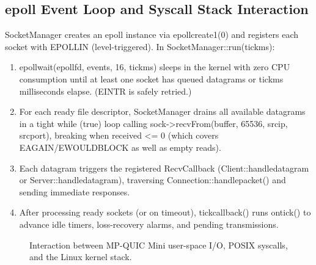 \documentclass[10pt,a4paper]{article}
\newcommand{\codeul}{\textunderscore\hspace{0pt}}
\DeclareRobustCommand{\code}[1]{{\ttfamily\let\_\codeul #1}}
\begin{document}
\subsection{\code{epoll} Event Loop and Syscall Stack Interaction}
\code{SocketManager} creates an epoll instance via \code{epoll\_create1(0)} and registers each socket with \code{EPOLLIN} (level-triggered). In \code{SocketManager::run(tick\_ms)}:
\begin{enumerate}
    \item \code{epoll\_wait(epoll\_fd, events, 16, tick\_ms)} sleeps in the kernel with zero CPU consumption until at least one socket has queued datagrams or \code{tick\_ms} milliseconds elapse. (\code{EINTR} is safely retried.)
    \item For each ready file descriptor, \code{SocketManager} drains all available datagrams in a tight \code{while (true)} loop calling \code{sock->recvFrom(buffer, 65536, src\_ip, src\_port)}, breaking when \code{received <= 0} (which covers \code{EAGAIN}/\code{EWOULDBLOCK} as well as empty reads).
    \item Each datagram triggers the registered \code{RecvCallback} (\code{Client::handle\_datagram} or \code{Server::handle\_datagram}), traversing \code{Connection::handle\_packet()} and sending immediate responses.
    \item After processing ready sockets (or on timeout), \code{tick\_callback()} runs \code{on\_tick()} to advance idle timers, loss-recovery alarms, and pending transmissions.
\end{enumerate}

\begin{figure}[H]
\centering
{}
\caption{Interaction between MP-QUIC Mini user-space I/O, POSIX syscalls, and the Linux kernel stack.}
\label{fig:linux_io}
\end{figure}
\end{document}
